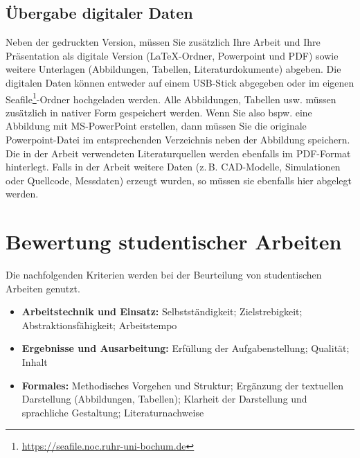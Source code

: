 \subsection{Übergabe digitaler Daten}
\label{sub:Übergabe digitaler Daten}

Neben der gedruckten Version, müssen Sie zusätzlich Ihre Arbeit und Ihre Präsentation als digitale Version (LaTeX-Ordner, Powerpoint und PDF) sowie weitere Unterlagen (Abbildungen, Tabellen, Literaturdokumente) abgeben.
Die digitalen Daten können entweder auf einem USB-Stick abgegeben oder im eigenen Seafile\footnote{\url{https://seafile.noc.ruhr-uni-bochum.de}}-Ordner hochgeladen werden.
Alle Abbildungen, Tabellen usw. müssen zusätzlich in nativer Form gespeichert werden.
Wenn Sie also bspw. eine Abbildung mit MS-PowerPoint erstellen, dann müssen Sie die originale Powerpoint-Datei im entsprechenden Verzeichnis neben der Abbildung speichern.
Die in der Arbeit verwendeten Literaturquellen werden ebenfalls im PDF-Format hinterlegt.
Falls in der Arbeit weitere Daten (z.\,B. CAD-Modelle, Simulationen oder Quellcode, Messdaten) erzeugt wurden, so müssen sie ebenfalls hier abgelegt werden.


\section{Bewertung studentischer Arbeiten}
\label{sec:Bewertung studentischer Arbeiten}

Die nachfolgenden Kriterien werden bei der Beurteilung von studentischen Arbeiten genutzt.

\noindent
\begin{itemize}
	\item \textbf{Arbeitstechnik und Einsatz:} Selbstständigkeit; Zielstrebigkeit; Abstraktionsfähigkeit; Arbeitstempo
	\item \textbf{Ergebnisse und Ausarbeitung:} Erfüllung der Aufgabenstellung; Qualität; Inhalt
	\item \textbf{Formales:} Methodisches Vorgehen und Struktur; Ergänzung der textuellen Darstellung (Abbildungen, Tabellen); Klarheit der Darstellung und sprachliche Gestaltung; Literaturnachweise
\end{itemize}


